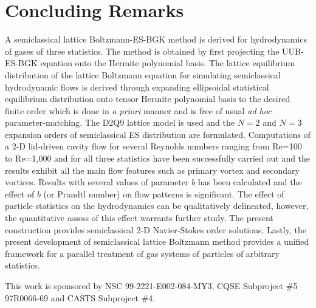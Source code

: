 \documentclass[aip,jmp,amsmath,amssymb,reprint,noshowpacs]{revtex4-1}
\begin{document}
\section{Concluding Remarks}
A semiclassical lattice Boltzmann-ES-BGK method is derived for hydrodynamics of gases of three statistics. The method is obtained by first projecting the UUB-ES-BGK equation onto the Hermite polynomial basis.  The lattice equilibrium distribution of the lattice Boltzmann equation for simulating semiclassical hydrodynamic flows is derived through expanding ellipsoidal statistical equilibrium distribution onto tensor Hermite polynomial basis to the desired finite order which is done in {\sl a priori} manner and is free of usual {\sl ad hoc} parameter-matching. The D2Q9 lattice model is used and the $N=2$ and $N=3$ expansion orders of semiclassical ES distribution are formulated. Computations of a 2-D lid-driven cavity flow for several Reynolds numbers ranging from Re=100 to Re=1,000 and for all three statistics have been successfully carried out and the results exhibit all the main flow features such as primary vortex and secondary vortices. Results with several values of parameter $b$ has been calculated and the effect of $b$ (or Prandtl number) on flow patterns is significant.  The effect of particle statistics on the hydrodynamics can be qualitatively delineated, however, the quantitative assess of this effect warrants further study.  The present construction provides semiclassical 2-D Navier-Stokes order solutions. Lastly, the present development of semiclassical lattice Boltzmann method provides a unified framework for a parallel treatment of gas systems of particles of arbitrary statistics.

\acknowledgments
This work is sponsored by NSC 99-2221-E002-084-MY3, CQSE Subproject \#5 97R0066-69 and CASTS Subproject \#4.
\end{document}

